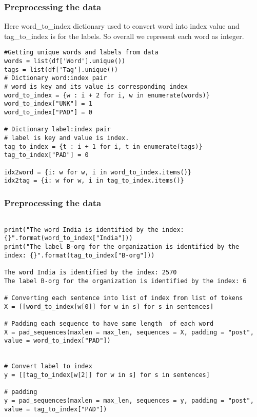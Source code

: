 \begin{frame}[fragile]\frametitle{Preprocessing the data}
Here word\_to\_index dictionary used to convert word into index value and tag\_to\_index is for the labels. So overall we represent each word as integer.

\begin{lstlisting}
#Getting unique words and labels from data
words = list(df['Word'].unique())
tags = list(df['Tag'].unique())
# Dictionary word:index pair
# word is key and its value is corresponding index
word_to_index = {w : i + 2 for i, w in enumerate(words)}
word_to_index["UNK"] = 1
word_to_index["PAD"] = 0

# Dictionary label:index pair
# label is key and value is index.
tag_to_index = {t : i + 1 for i, t in enumerate(tags)}
tag_to_index["PAD"] = 0

idx2word = {i: w for w, i in word_to_index.items()}
idx2tag = {i: w for w, i in tag_to_index.items()}
\end{lstlisting}
\end{frame}

\begin{frame}[fragile]\frametitle{Preprocessing the data}

\begin{lstlisting}

print("The word India is identified by the index: {}".format(word_to_index["India"]))
print("The label B-org for the organization is identified by the index: {}".format(tag_to_index["B-org"]))

The word India is identified by the index: 2570
The label B-org for the organization is identified by the index: 6

# Converting each sentence into list of index from list of tokens
X = [[word_to_index[w[0]] for w in s] for s in sentences]

# Padding each sequence to have same length  of each word
X = pad_sequences(maxlen = max_len, sequences = X, padding = "post", value = word_to_index["PAD"])


# Convert label to index
y = [[tag_to_index[w[2]] for w in s] for s in sentences]

# padding
y = pad_sequences(maxlen = max_len, sequences = y, padding = "post", value = tag_to_index["PAD"])
\end{lstlisting}
\end{frame}

